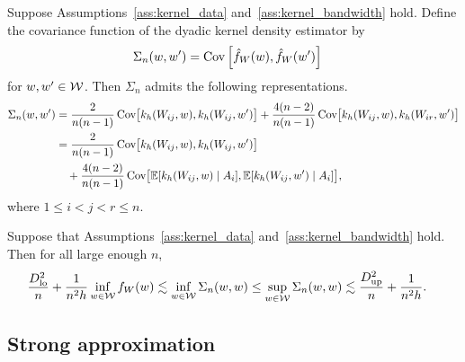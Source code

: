 \begin{lemma}
  \label{lem:covariance_structure}

  Suppose Assumptions~\ref{ass:kernel_data}
  and~\ref{ass:kernel_bandwidth} hold.
  Define the covariance function of the
  dyadic kernel density estimator by
  \begin{align*}
    \Sigma_n(w,w')
    &=
    \operatorname{Cov}\Big[
      \hat f_W(w),
      \hat f_W(w')
      \Big]
  \end{align*}
  for $w,w' \in \mathcal{W}$.
  Then $\Sigma_n$ admits the following
  representations.
  \begin{align*}
    \Sigma_n(w,w')
    &=
    \frac{2}{n(n-1)}
    \operatorname{Cov}\hspace*{-0.7mm}\big[
      k_h(W_{ij},w),
      k_h(W_{ij},w')
      \big]
    +
    \frac{4(n-2)}{n(n-1)}
    \operatorname{Cov}\hspace*{-0.7mm}\big[
      k_h(W_{ij},w),
      k_h(W_{ir},w')
      \big] \\
    &=
    \frac{2}{n(n-1)}
    \operatorname{Cov}\hspace*{-0.7mm}\big[
      k_h(W_{ij},w),
      k_h(W_{ij},w')
      \big] \\
    &\quad+
    \frac{4(n-2)}{n(n-1)}
    \operatorname{Cov}\hspace*{-0.7mm}\big[
      \mathbb{E}[k_h(W_{ij},w) \mid A_i],
      \mathbb{E}[k_h(W_{ij},w') \mid A_i]
      \big],
  \end{align*}
  where $1 \leq i < j < r \leq n$.

\end{lemma}

\begin{lemma}
  \label{lem:app_variance_bounds}

  Suppose that Assumptions~\ref{ass:kernel_data}
  and~\ref{ass:kernel_bandwidth} hold.
  Then for all large enough $n$,
  \begin{align*}
    \frac{D_{\textup{lo}}^2}{n}
    + \frac{1}{n^2h}
    \inf_{w \in \mathcal{W}} f_W(w)
    &\lesssim
    \inf_{w \in \mathcal{W}} \Sigma_n(w,w)
    \leq
    \sup_{w \in \mathcal{W}} \Sigma_n(w,w)
    \lesssim
    \frac{D_{\textup{up}}^2}{n}
    + \frac{1}{n^2h}.
  \end{align*}

\end{lemma}

\subsection{Strong approximation}
\label{sec:strong_approx}

